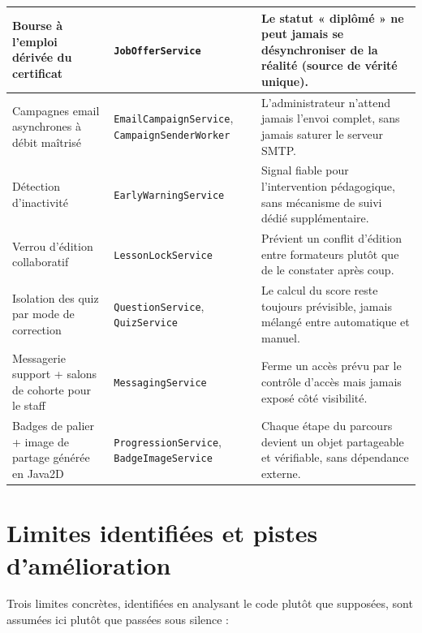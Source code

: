 \begin{center}
\begin{longtable}{|p{2.6cm}|p{4.1cm}|p{6.3cm}|}
    Bourse à l'emploi dérivée du certificat & \texttt{JobOffer\allowbreak Service} & Le statut « diplômé » ne peut jamais se désynchroniser de la réalité (source de vérité unique). \\ \hline
    Campagnes email asynchrones à débit maîtrisé & \texttt{EmailCampaign\allowbreak Service}, \texttt{CampaignSender\allowbreak Worker} & L'administrateur n'attend jamais l'envoi complet, sans jamais saturer le serveur SMTP. \\ \hline
    Détection d'inactivité & \texttt{EarlyWarning\allowbreak Service} & Signal fiable pour l'intervention pédagogique, sans mécanisme de suivi dédié supplémentaire. \\ \hline
    Verrou d'édition collaboratif & \texttt{LessonLock\allowbreak Service} & Prévient un conflit d'édition entre formateurs plutôt que de le constater après coup. \\ \hline
    Isolation des quiz par mode de correction & \texttt{Question\allowbreak Service}, \texttt{Quiz\allowbreak Service} & Le calcul du score reste toujours prévisible, jamais mélangé entre automatique et manuel. \\ \hline
    Messagerie support + salons de cohorte pour le staff & \texttt{Messaging\allowbreak Service} & Ferme un accès prévu par le contrôle d'accès mais jamais exposé côté visibilité. \\ \hline
    Badges de palier + image de partage générée en Java2D & \texttt{Progression\allowbreak Service}, \texttt{Badge\allowbreak Image\allowbreak Service} & Chaque étape du parcours devient un objet partageable et vérifiable, sans dépendance externe. \\ \hline
  \end{longtable}
\end{center}

\section{Limites identifiées et pistes d'amélioration}
\label{sec:limites}

Trois limites concrètes, identifiées en analysant le code plutôt que
supposées, sont assumées ici plutôt que passées sous silence :


